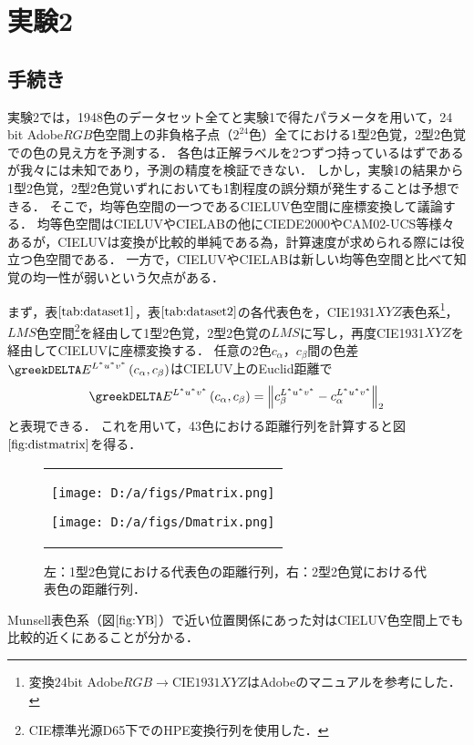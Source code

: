 \documentclass[uplatex,paper=a4,fontsize=4.0truemm,jafontsize=4.0truemm,head_space=30.0truemm,foot_space=30.0truemm,baselineskip=8.0truemm,line_length=40zw,gutter=25.0truemm,oneside,openany,fleqn,hanging_panctuation,open_bracket_pos=nibu_tentsuki,dvipdfmx,jis2004,book,titlepage]{jlreq}
\theoremstyle{mystyle}
\newcommand{\captiondot}[1]{\caption{#1．}}
\newcommand{\mathdisplaystyle}[1]{\(\displaystyle{#1}\)}
\newcommand{\Reference}[1]{\mathdisplaystyle{\ref{#1}}}
\newcommand{\parentheses}[1]{\left(#1\right)}
\newcommand{\norm}[2]{{\left\lVert#1\right\rVert}_{#2}}
\begin{document}
		\section{実験2}
			\subsection{手続き}
				実験2では，1948色のデータセット全てと実験1で得たパラメータを用いて，24 bit Adobe\mathdisplaystyle{RGB}色空間上の非負格子点（\mathdisplaystyle{2^{24}}色）全てにおける1型2色覚，2型2色覚での色の見え方を予測する．
				各色は正解ラベルを2つずつ持っているはずであるが我々には未知であり，予測の精度を検証できない．
				しかし，実験1の結果から1型2色覚，2型2色覚いずれにおいても1割程度の誤分類が発生することは予想できる．
				そこで，均等色空間の一つであるCIELUV色空間に座標変換して議論する．
				均等色空間はCIELUVやCIELABの他にCIEDE2000やCAM02-UCS等様々ある\cite{Yaguchi2017b}が，CIELUVは変換が比較的単純である為，計算速度が求められる際には役立つ色空間である．
				一方で，CIELUVやCIELABは新しい均等色空間と比べて知覚の均一性が弱いという欠点がある\cite[p.~10]{Robertson1977}．

				まず，表\Reference{tab:dataset1}，表\Reference{tab:dataset2}の各代表色を，CIE1931\mathdisplaystyle{XYZ}表色系\footnote{変換\mathdisplaystyle{\textrm{24bit Adobe}RGB\to\textrm{CIE1931}XYZ}はAdobe\textregistered のマニュアル\cite{Adobe2005}を参考にした．}，\mathdisplaystyle{LMS}色空間\footnote{CIE標準光源D65下でのHPE変換行列を使用した．}を経由して1型2色覚，2型2色覚の\mathdisplaystyle{LMS}に写し，再度CIE1931\mathdisplaystyle{XYZ}を経由してCIELUVに座標変換する．
				任意の2色\mathdisplaystyle{c_\alpha}，\mathdisplaystyle{c_\beta}間の色差\mathdisplaystyle{\greekDELTA E^{L^\ast u^\ast v^\ast}\parentheses{c_\alpha,c_\beta}}はCIELUV上のEuclid距離で
				\begin{equation*}
					\greekDELTA E^{L^\ast u^\ast v^\ast}\parentheses{c_\alpha,c_\beta}=\norm{c_\beta^{L^\ast u^\ast v^\ast}-c_\alpha^{L^\ast u^\ast v^\ast}}{2}
				\end{equation*}
				と表現できる．
				これを用いて，43色における距離行列を計算すると図\Reference{fig:distmatrix}を得る．
				\begin{figure}[tbp]
					\centering
					\begin{tabular}{c}
						\begin{minipage}{0.5\linewidth}
							\centering
							\texttt{[image: D:/a/figs/Pmatrix.png]}
						\end{minipage}
						\begin{minipage}{0.5\linewidth}
							\centering
							\texttt{[image: D:/a/figs/Dmatrix.png]}
						\end{minipage}
					\end{tabular}
					\captiondot{左：1型2色覚における代表色の距離行列，右：2型2色覚における代表色の距離行列}\label{fig:distmatrix}
				\end{figure}
				Munsell表色系（図\Reference{fig:YB}）で近い位置関係にあった対はCIELUV色空間上でも比較的近くにあることが分かる．
\end{document}
